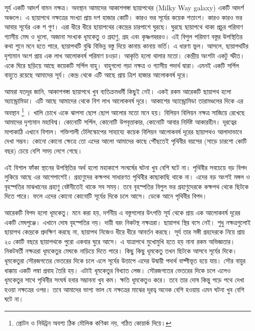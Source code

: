 \documentclass[
]{book}
\begin{document}
সূর্য একটি আদর্শ বামন নক্ষত্র। অবস্থান আমাদের আকাশগঙ্গা ছায়াপথের (Milky Way galaxy) একটি আদর্শ অঞ্চলে। এ ছায়াপথে নক্ষত্রের সংখ্যা প্রায় দশ হাজার কোটি। কারও ভর সূর্যের কয়েক শতাংশ। কারও কারও ভর আবার সূর্যের এক শ গুণ। এরা ধীরে ধীরে ছায়াপথের কেন্দ্রের চারপাশে ঘুরছে। ঘুরছে ছায়াপথে থাকা প্রচুর পরিমাণ গ্যাসীয় মেঘ ও ধুলো, অজানা সংখ্যক ধূমকেতু ও গ্রহাণু, গ্রহ এবং কৃষ্ণগহ্বরও। এই বিপুল পরিমাণ বস্তুর উপস্থিতির কথা শুনে মনে হতে পারে, ছায়াপথটি বুঝি বিভিন্ন বস্তু দিয়ে কানায় কানায় ভর্তি। এ ধারণা ভুল। আসলে, ছায়াপথটির দৃশ্যমান অংশ প্রায় এক লাখ আলোকবর্ষ পরিমাণ চওড়া। আকৃতি হলো থালার মতো। কেন্দ্রীয় অংশটা একটু স্ফীত। একে ঘিরে ছড়িয়ে আছে কয়েকটি সর্পিল বাহু। বাহুগলো গড়া নক্ষত্র ও গ্যাসীয় পদার্থ দ্বারা। এমনই একটি সর্পিল বাহুতে রয়েছে আমাদের সূর্য। কেন্দ্র থেকে এটি আছে প্রায় ত্রিশ হাজার আলোকবর্ষ দূরে।

আমরা যতদূর জানি, আকাশগঙ্গা ছায়াপথে খুব ব্যতিক্রমধর্মী কিছুই নেই। একই রকম আরেকটি ছায়াপথ হলো অ্যান্ড্রোমিডা। এটি আছে আমাদের থেকে বিশ লাখ আলোকবর্ষ দূরে। আকাশের অ্যান্ড্রোমিডা তারামণ্ডলের দিকে এর অবস্থান \footnote{প্রোটন ও নিউট্রন অবশ্য ঠিক মৌলিক কণিকা নয়, গঠিত কোয়ার্ক দিয়ে।} । খালি চোখে একে ঝাপসা ছোপ ছোপ আলোর মতো মনে হয়। বিলিয়ন বিলিয়ন নক্ষত্র সাজিয়ে রেখেছে আমাদের দৃশ্যমান মহাবিশ্ব। কোনোটি সর্পিল, কোনোটি উপবৃত্তাকার, কোনোটি আবার নির্দিষ্ট আকারহীন। দূরত্বের মাপাকাঠি এখানে বিশাল। শক্তিশালী টেলিস্কোপের সাহায্যে কয়েক বিলিয়ন আলোকবর্ষ দূরের ছায়াপথও আলাদাভাবে দেখা সম্ভব। কোনো কোনো ক্ষেত্রে তো এদের আলো আমাদের কাছে পৌঁছতেই পৃথিবীর বয়সের (সাড়ে চারশো কোটি বছর) চেয়ে বেশি সময় লেগে গেছে।

এই বিশাল ফাঁকা স্থানের উপস্থিতির অর্থ হলো মহাকাশে সংঘর্ষের ঘটনা খুব বেশি ঘটে না। পৃথিবীর সবচেয়ে বড় বিপদ লুকিয়ে আছে এর আশেপাশেই। গ্রহাণুদের কক্ষপথ সাধারণত পৃথিবীর কাছাকাছি থাকে না। এদের বড় অংশই মঙ্গল ও বৃহস্পতির মাঝখানের গ্রহাণু বেষ্টনীতেই থাকে সব সময়। তবে বৃহস্পতির বিপুল ভর গ্রহাণুদেরকে কক্ষপথ থেকে ছিটকে দিতে পারে। ফলে এদের কোনো কোনোটি সূর্যের দিকে চলে আসে। ডেকে আনে পৃথিবীর বিপদ।

আরেকটি বিপদ হলো ধূমকেতু। মনে করা হয়, দর্শনীয় এ বস্তুগলোর উৎপত্তি সূর্য থেকে প্রায় এক আলোকবর্ষ দূরের একটি মেঘপুঞ্জে। এখানে দোষ বৃহস্পতির নয়। দায়ী বরং নিকটস্থ নক্ষত্ররা। ছায়াপথ স্থির বসে নেই। শুধু নক্ষত্রগুলোই ছায়াপথ কেন্দ্রকে প্রদক্ষিণ করছে না, ছায়াপথ নিজেও ধীরে ধীরে আবর্তন করছে। সূর্য তার সঙ্গী গ্রহদেরকে নিয়ে প্রায় ২০ কোটি বছরে ছায়াপথকে পুরো একবার ঘুরে আসে। এ যাত্রাপথে মুখোমুখি হতে হয় নানা রকম অভিজ্ঞতার। নিকটবর্তী নক্ষত্ররা ধূমকেতুর মেঘকে নাড়িয়ে দিতে পারে। কিছু কিছু ধূমকেতু তখন ছিটকে আসবে সূর্যের দিকে। ধূমকেতুরা সৌরজগতের ভেতরের দিকে চলে এলে সূর্যের উত্তাপে এদের উদ্বায়ী পদার্থ বাষ্পীভূত হয়ে যায়। সৌর বায়ুর ধাক্কায় একটি লম্বা প্রবাহ তৈরি হয়। এটাই ধূমকেতুর বিখ্যাত লেজ। সৌরজগতের ভেতরের দিকে চলে এলেও ধূমকেতুর সাথে পৃথিবীর সংঘর্ষ হবার সম্ভাবনা খুব কম। ক্ষতি ধূমকেতুও করে। তবে তার দোষ কিন্তু পড়ে পথে দেখা হওয়া নক্ষত্রের ওপর। তবে আমাদের ভাগ্য ভাল যে নক্ষত্রের মাঝের দূরত্ব অনেক বেশি হওয়ায় এমন ঘটনা খুব বেশি ঘটে না।
\end{document}
